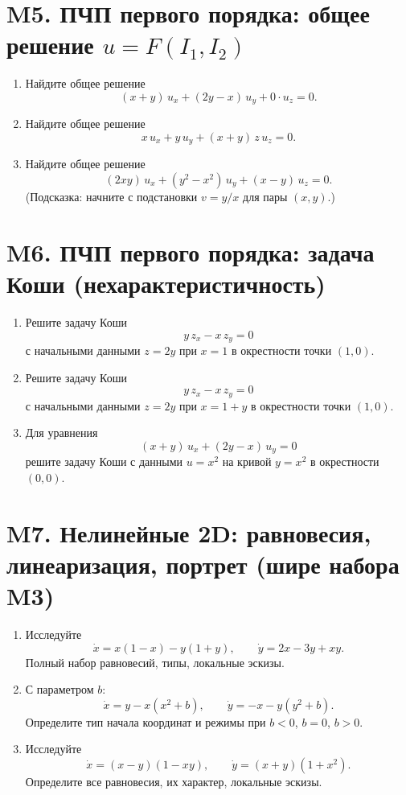 \documentclass[12pt]{article}
\begin{document}
\section{M5. ПЧП первого порядка: общее решение $u=F(I_1,I_2)$}
\begin{enumerate}
\item Найдите общее решение
\[
(x+y)\,u_x+(2y-x)\,u_y+0\cdot u_z=0.
\]

\item Найдите общее решение
\[
x\,u_x+y\,u_y+(x+y)\,z\,u_z=0.
\]

\item Найдите общее решение
\[
(2xy)\,u_x+(y^2-x^2)\,u_y+(x-y)\,u_z=0.
\]
(Подсказка: начните с подстановки $v=y/x$ для пары $(x,y)$.)
\end{enumerate}

\section{M6. ПЧП первого порядка: задача Коши (нехарактеристичность)}
\begin{enumerate}
\item Решите задачу Коши
\[
y\,z_x - x\,z_y = 0
\]
с начальными данными $z = 2y$ при $x = 1$ в окрестности точки $(1,0)$.

\item Решите задачу Коши
\[
y\,z_x - x\,z_y = 0
\]
с начальными данными $z = 2y$ при $x = 1+y$ в окрестности точки $(1,0)$.

\item Для уравнения
\[
(x+y)\,u_x + (2y-x)\,u_y = 0
\]
решите задачу Коши с данными $u = x^2$ на кривой $y = x^2$ в окрестности $(0,0)$.
\end{enumerate}

\section{M7. Нелинейные 2D: равновесия, линеаризация, портрет (шире набора M3)}
\begin{enumerate}
\item Исследуйте
\[
\dot x = x(1-x)-y(1+y),\qquad
\dot y = 2x -3y + xy.
\]
Полный набор равновесий, типы, локальные эскизы.

\item С параметром $b$:
\[
\dot x = y - x(x^2+b),\qquad
\dot y = -x - y(y^2+b).
\]
Определите тип начала координат и режимы при $b<0$, $b=0$, $b>0$.

\item Исследуйте
\[
\dot x = (x-y)(1-xy),\qquad
\dot y = (x+y)(1+x^2).
\]
Определите все равновесия, их характер, локальные эскизы.
\end{enumerate}
\end{document}
